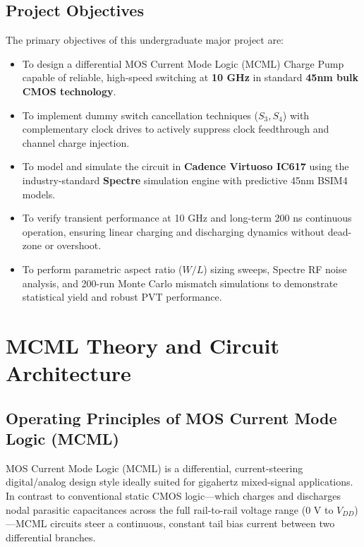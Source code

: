 \documentclass[11pt,a4paper]{report}
\begin{document}
\section{Project Objectives}
The primary objectives of this undergraduate major project are:
\begin{itemize}
    \item To design a differential MOS Current Mode Logic (MCML) Charge Pump capable of reliable, high-speed switching at \textbf{10 GHz} in standard \textbf{45nm bulk CMOS technology}.
    \item To implement dummy switch cancellation techniques ($S_3, S_4$) with complementary clock drives to actively suppress clock feedthrough and channel charge injection.
    \item To model and simulate the circuit in \textbf{Cadence Virtuoso IC617} using the industry-standard \textbf{Spectre} simulation engine with predictive 45nm BSIM4 models.
    \item To verify transient performance at 10 GHz and long-term 200 ns continuous operation, ensuring linear charging and discharging dynamics without dead-zone or overshoot.
    \item To perform parametric aspect ratio ($W/L$) sizing sweeps, Spectre RF noise analysis, and 200-run Monte Carlo mismatch simulations to demonstrate statistical yield and robust PVT performance.
\end{itemize}

\newpage

\chapter{MCML Theory and Circuit Architecture}

\section{Operating Principles of MOS Current Mode Logic (MCML)}
MOS Current Mode Logic (MCML) is a differential, current-steering digital/analog design style ideally suited for gigahertz mixed-signal applications. In contrast to conventional static CMOS logic---which charges and discharges nodal parasitic capacitances across the full rail-to-rail voltage range ($0\text{ V}$ to $V_{DD}$)---MCML circuits steer a continuous, constant tail bias current between two differential branches.
\end{document}
